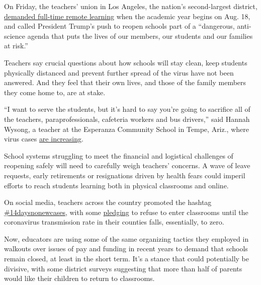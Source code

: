 On Friday, the teachers' union in Los Angeles, the nation's
second-largest district,
\href{https://www.utla.net/news/utla-recommends-keeping-school-campuses-closed}{demanded
full-time remote learning} when the academic year begins on Aug. 18, and
called President Trump's push to reopen schools part of a ``dangerous,
anti-science agenda that puts the lives of our members, our students and
our families at risk.''

Teachers say crucial questions about how schools will stay clean, keep
students physically distanced and prevent further spread of the virus
have not been answered. And they feel that their own lives, and those of
the family members they come home to, are at stake.

``I want to serve the students, but it's hard to say you're going to
sacrifice all of the teachers, paraprofessionals, cafeteria workers and
bus drivers,'' said Hannah Wysong, a teacher at the Esperanza Community
School in Tempe, Ariz., where virus cases
\href{https://www.nytimes3xbfgragh.onion/interactive/2020/us/arizona-coronavirus-cases.html}{are
increasing}.

School systems struggling to meet the financial and logistical
challenges of reopening safely will need to carefully weigh teachers'
concerns. A wave of leave requests, early retirements or resignations
driven by health fears could imperil efforts to reach students learning
both in physical classrooms and online.

On social media, teachers across the country promoted the hashtag
\href{https://twitter.com/search?q=\%2314daysnonewcases\&src=typed_query}{\#14daysnonewcases},
with some
\href{https://www.change.org/p/u-s-department-of-education-refuse-to-return-to-campus-until-counties-report-no-new-cases-for-14-days?utm_content=cl_sharecopy_23175660_en-US\%3A0\&recruiter=441547298\&recruited_by_id=44bf9f90-9ac2-11e5-a10a-97d04f3cc37d\&utm_source=share_petition\&utm_medium=copylink\&utm_campaign=psf_combo_share_abi\&utm_term=psf_combo_share_abi}{pledging}
to refuse to enter classrooms until the coronavirus transmission rate in
their counties falls, essentially, to zero.

Now, educators are using some of the same organizing tactics they
employed in walkouts over issues of pay and funding in recent years to
demand that schools remain closed, at least in the short term. It's a
stance that could potentially be divisive, with some district surveys
suggesting that more than half of parents would like their children to
return to classrooms.

